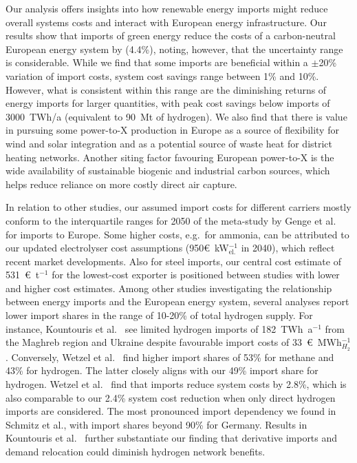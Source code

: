Our analysis offers insights into how renewable energy imports might reduce
overall systems costs and interact with European energy infrastructure. Our
results show that imports of green energy reduce the costs of a carbon-neutral
European energy system by  (4.4\%), noting, however, that the
uncertainty range is considerable. While we find that some imports are
beneficial within a $\pm$20\% variation of import costs, system cost savings
range between 1\% and 10\%. However, what is consistent within this range are
the diminishing returns of energy imports for larger quantities, with peak cost
savings below imports of 3000~TWh/a (equivalent to 90~Mt of hydrogen). We also find
that there is value in pursuing some \mbox{power-to-X} production in Europe as a
source of flexibility for wind and solar integration and as a potential source
of waste heat for district heating networks. Another siting factor favouring
European \mbox{power-to-X} is the wide availability of sustainable biogenic and
industrial carbon sources, which helps reduce reliance on more costly direct air
capture.

In relation to other studies, our assumed import costs for different carriers
mostly conform to the interquartile ranges for 2050 of the meta-study by Genge
et al.~\cite{gengeSupplyCostsGreen2023} for imports to Europe. Some higher
costs, e.g.~for ammonia, can be attributed to our updated electrolyser cost
assumptions (950\euro{}~kW$_\text{el.}^{-1}$ in 2040), which reflect recent
market developments.\cite{ieaGlobalHydrogenReview2024} Also for steel imports,
our central cost estimate of 531~\euro{}~t$^{-1}$ for the lowest-cost exporter
is positioned between studies with lower\cite{lopezDefossilisedSteel2023} and
higher\cite{verpoortImpactGlobalHeterogeneity2024} cost estimates. Among other
studies investigating the relationship between energy imports and the European
energy system, several analyses report lower import shares in the range of
10-20\% of total hydrogen
supply.\cite{seckHydrogenDecarbonization2022,frischmuthHydrogenSourcingStrategies2022,kountourisUnifiedEuropeanHydrogen2024}
For instance, Kountouris et al.~\cite{kountourisUnifiedEuropeanHydrogen2024} see
limited hydrogen imports of 182~TWh~a$^{-1}$ from the Maghreb region and Ukraine
despite favourable import costs of 33~\euro{}~MWh$_{H_2}^{-1}$. Conversely,
Wetzel et al.~\cite{wetzelGreenEnergy2023a} find higher import shares of 53\%
for methane and 43\% for hydrogen. The latter closely aligns with our 49\%
import share for hydrogen. Wetzel et al.~\cite{wetzelGreenEnergy2023a} find that
imports reduce system costs by 2.8\%, which is also comparable to our 2.4\%
system cost reduction when only direct hydrogen imports are considered. The most
pronounced import dependency we found in Schmitz et
al.\cite{schmitzImplicationsHydrogenImport2024a}, with import shares beyond 90\%
for Germany. Results in Kountouris et
al.~\cite{kountourisUnifiedEuropeanHydrogen2024} further substantiate our
finding that derivative imports and demand relocation could diminish hydrogen
network benefits.

